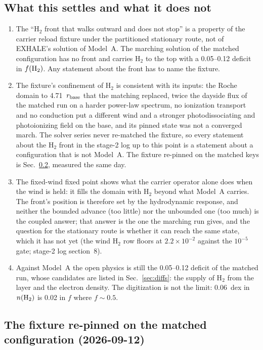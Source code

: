 \documentclass[english,a4paper]{my_memo}
\begin{document}
\subsection{What this settles and what it does not}

\begin{enumerate}
\item The ``H$_2$ front that walks outward and does not stop'' is a
  property of the carrier reload fixture under the partitioned stationary
  route, not of EXHALE's solution of Model~A. The marching solution of the
  matched configuration has no front and carries H$_2$ to the top with a
  0.05--0.12 deficit in $f({\rm H}_2)$. Any statement about the front has to
  name the fixture.
\item The fixture's confinement of H$_2$ is consistent with its inputs: the
  Roche domain to 4.71~$r_{\rm base}$ that the matching replaced, twice the
  dayside flux of the matched run on a harder power-law spectrum, no
  ionization transport and no conduction put a different wind and a
  stronger photodissociating and photoionizing field on the base, and its
  pinned state was not a converged march. The solver series
  never re-matched the fixture, so every statement about the H$_2$ front in
  the stage-2 log up to this point is a statement about a configuration that
  is not Model~A. The fixture re-pinned on the matched keys is
  Sec.~\ref{sec:matchedfixture}, measured the same day.
\item The fixed-wind fixed point shows what the carrier operator alone does
  when the wind is held: it fills the domain with H$_2$ beyond what Model~A
  carries. The front's position is therefore set by the hydrodynamic
  response, and neither the bounded advance (too little) nor the unbounded
  one (too much) is the coupled answer; that answer is the one the marching
  run gives, and the question for the stationary route is whether it can
  reach the same state, which it has not yet (the wind H$_2$ row floors at
  $2.2\times10^{-2}$ against the $10^{-5}$ gate; stage-2 log section~8).
\item Against Model~A the open physics is still the 0.05--0.12 deficit of
  the matched run, whose candidates are listed in Sec.~\ref{sec:diffs}: the
  supply of H$_2$ from the layer and the electron density. The digitization
  is not the limit: 0.06~dex in $n({\rm H}_2)$ is 0.02 in $f$ where
  $f \sim 0.5$.
\end{enumerate}


\subsection{The fixture re-pinned on the matched configuration (2026-09-12)}
\label{sec:matchedfixture}
\end{document}
